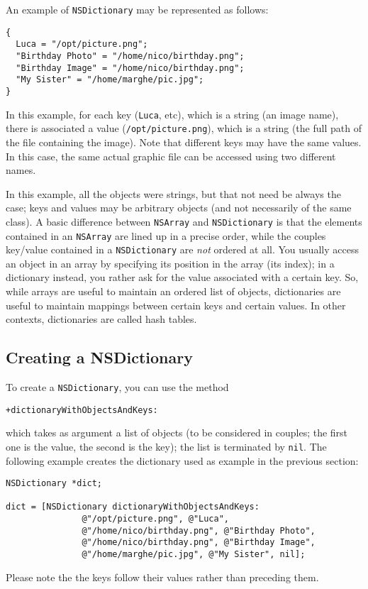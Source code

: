 \documentclass[a4paper]{article}
\begin{document}
An example of \texttt{NSDictionary} may be represented as follows: 
\begin{verbatim}
{
  Luca = "/opt/picture.png";
  "Birthday Photo" = "/home/nico/birthday.png";
  "Birthday Image" = "/home/nico/birthday.png";
  "My Sister" = "/home/marghe/pic.jpg";
}
\end{verbatim}
In this example, for each key (\texttt{Luca}, etc), which is a string
(an image name), there is associated a value
(\texttt{/opt/picture.png}), which is a string (the full path of the
file containing the image).  Note that different keys may have the
same values.  In this case, the same actual graphic file can be
accessed using two different names.

In this example, all the objects were strings, but that not need be
always the case; keys and values may be arbitrary objects (and not
necessarily of the same class).  A basic difference between
\texttt{NSArray} and \texttt{NSDictionary} is that the elements
contained in an \texttt{NSArray} are lined up in a precise order,
while the couples key/value contained in a \texttt{NSDictionary} are
\emph{not} ordered at all.  You usually access an object in an array
by specifying its position in the array (its index); in a dictionary
instead, you rather ask for the value associated with a certain key.
So, while arrays are useful to maintain an ordered list of objects,
dictionaries are useful to maintain mappings between certain keys 
and certain values.  In other contexts, dictionaries are called 
hash tables.

\subsection{Creating a NSDictionary}
To create a \texttt{NSDictionary}, you can use the method 
\begin{verbatim}
+dictionaryWithObjectsAndKeys:
\end{verbatim}
which takes as argument a list of objects (to be considered in
couples; the first one is the value, the second is the key); the list
is terminated by \texttt{nil}.  The following example creates the
dictionary used as example in the previous section:
\begin{verbatim}
NSDictionary *dict;

dict = [NSDictionary dictionaryWithObjectsAndKeys:
               @"/opt/picture.png", @"Luca", 
               @"/home/nico/birthday.png", @"Birthday Photo", 
               @"/home/nico/birthday.png", @"Birthday Image", 
               @"/home/marghe/pic.jpg", @"My Sister", nil];
\end{verbatim}
Please note the the keys follow their values rather than preceding 
them.
\end{document}
